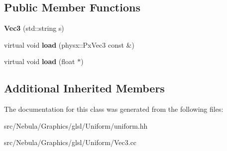 \subsection*{Public Member Functions}
\begin{DoxyCompactItemize}
\item 
\hypertarget{classNeb_1_1glsl_1_1Uniform_1_1Scalar_1_1Vec3_a00e17308113063b4413ea425ddf975ad}{{\bfseries Vec3} (std\-::string s)}\label{classNeb_1_1glsl_1_1Uniform_1_1Scalar_1_1Vec3_a00e17308113063b4413ea425ddf975ad}

\item 
\hypertarget{classNeb_1_1glsl_1_1Uniform_1_1Scalar_1_1Vec3_a5713aa74fb8e57849ce10f0f9ecf51b2}{virtual void {\bfseries load} (physx\-::\-Px\-Vec3 const \&)}\label{classNeb_1_1glsl_1_1Uniform_1_1Scalar_1_1Vec3_a5713aa74fb8e57849ce10f0f9ecf51b2}

\item 
\hypertarget{classNeb_1_1glsl_1_1Uniform_1_1Scalar_1_1Vec3_a2355fadc4a3d7be8cde7e4dc1f5c9475}{virtual void {\bfseries load} (float $\ast$)}\label{classNeb_1_1glsl_1_1Uniform_1_1Scalar_1_1Vec3_a2355fadc4a3d7be8cde7e4dc1f5c9475}

\end{DoxyCompactItemize}
\subsection*{Additional Inherited Members}


The documentation for this class was generated from the following files\-:\begin{DoxyCompactItemize}
\item 
src/\-Nebula/\-Graphics/glsl/\-Uniform/uniform.\-hh\item 
src/\-Nebula/\-Graphics/glsl/\-Uniform/Vec3.\-cc\end{DoxyCompactItemize}
